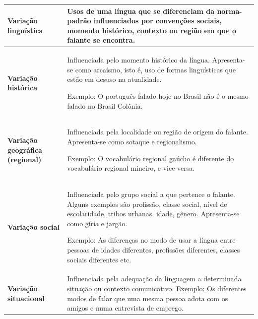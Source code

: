 \begin{longtable}[]{@{}ll@{}}
\toprule
\begin{minipage}[b]{0.46\columnwidth}\raggedright
\textbf{Variação linguística}\strut
\end{minipage} & \begin{minipage}[b]{0.46\columnwidth}\raggedright
Usos de uma língua que se diferenciam da norma-padrão influenciados por
convenções sociais, momento histórico, contexto ou região em que o
falante se encontra.\strut
\end{minipage}\tabularnewline
\midrule
\endhead
\begin{minipage}[t]{0.46\columnwidth}\raggedright
\textbf{Variação histórica}\strut
\end{minipage} & \begin{minipage}[t]{0.46\columnwidth}\raggedright
Influenciada pelo momento histórico da língua. Apresenta-se como
arcaísmo, isto é, uso de formas linguísticas que estão em desuso na
atualidade.

Exemplo: O português falado hoje no Brasil não é o mesmo falado no
Brasil Colônia.\strut
\end{minipage}\tabularnewline
\begin{minipage}[t]{0.46\columnwidth}\raggedright
\textbf{Variação geográfica (regional)}\strut
\end{minipage} & \begin{minipage}[t]{0.46\columnwidth}\raggedright
Influenciada pela localidade ou região de origem do falante.
Apresenta-se como sotaque e regionalismo.

Exemplo: O vocabulário regional gaúcho é diferente do vocabulário
regional mineiro, e vice-versa.\strut
\end{minipage}\tabularnewline
\begin{minipage}[t]{0.46\columnwidth}\raggedright
\textbf{Variação social}\strut
\end{minipage} & \begin{minipage}[t]{0.46\columnwidth}\raggedright
Influenciada pelo grupo social a que pertence o falante. Alguns exemplos
são profissão, classe social, nível de escolaridade, tribos urbanas,
idade, gênero. Apresenta-se como gíria e jargão.

Exemplo: As diferenças no modo de usar a língua entre pessoas de idades
diferentes, profissões diferentes, classes sociais diferentes etc.\strut
\end{minipage}\tabularnewline
\begin{minipage}[t]{0.46\columnwidth}\raggedright
\textbf{Variação situacional}\strut
\end{minipage} & \begin{minipage}[t]{0.46\columnwidth}\raggedright
Influenciada pela adequação da linguagem a determinada situação ou
contexto comunicativo. Exemplo: Os diferentes modos de falar que uma
mesma pessoa adota com os amigos e numa entrevista de emprego.\strut
\end{minipage}\tabularnewline
\bottomrule
\end{longtable}

